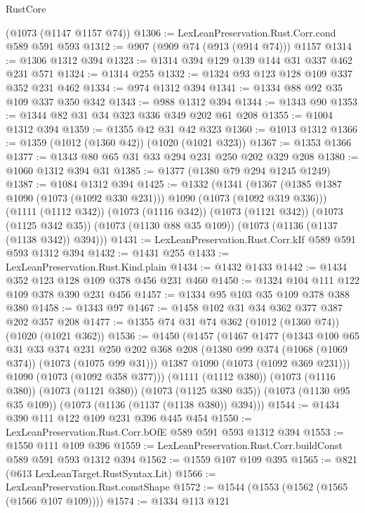 \begin{lexlean}{RustCore}
\begin{coremodule}
    (@1073 (@1147 @1157 @74))
@1306 := LexLeanPreservation.Rust.Corr.cond @589 @591 @593
@1312 := @907 (@909 @74 (@913 (@914 @74))) @1157
@1314 := @1306 @1312 @394
@1323 := @1314 @394 @129 @139 @144 @31 @337 @462 @231 @571
@1324 := @1314 @255
@1332 := @1324 @93 @123 @128 @109 @337 @352 @231 @462
@1334 := @974 @1312 @394
@1341 := @1334 @88 @92 @35 @109 @337 @350 @342
@1343 := @988 @1312 @394
@1344 := @1343 @90
@1353 := @1344 @82 @31 @34 @323 @336 @349 @202 @61 @208
@1355 := @1004 @1312 @394
@1359 := @1355 @42 @31 @42 @323
@1360 := @1013 @1312
@1366 := @1359 (@1012 (@1360 @42)) (@1020 (@1021 @323))
@1367 := @1353 @1366
@1377 := @1343 @80 @65 @31 @33 @294 @231 @250 @202 @329 @208
@1380 := @1060 @1312 @394 @31
@1385 := @1377 (@1380 @79 @294 @1245 @1249)
@1387 := @1084 @1312 @394
@1425 := @1332
    (@1341
      (@1367 (@1385 @1387 @1090 (@1073 (@1092 @330 @231))) @1090 (@1073 (@1092 @319 @336)))
      (@1111 (@1112 @342))
      (@1073 (@1116 @342))
      (@1073 (@1121 @342))
      (@1073 (@1125 @342 @35))
      (@1073 (@1130 @88 @35 @109))
      (@1073 (@1136 (@1137 (@1138 @342)) @394)))
@1431 := LexLeanPreservation.Rust.Corr.kIf @589 @591 @593 @1312 @394
@1432 := @1431 @255
@1433 := LexLeanPreservation.Rust.Kind.plain
@1434 := @1432 @1433
@1442 := @1434 @352 @123 @128 @109 @378 @456 @231 @460
@1450 := @1324 @104 @111 @122 @109 @378 @390 @231 @456
@1457 := @1334 @95 @103 @35 @109 @378 @388 @380
@1458 := @1343 @97
@1467 := @1458 @102 @31 @34 @362 @377 @387 @202 @357 @208
@1477 := @1355 @74 @31 @74 @362 (@1012 (@1360 @74)) (@1020 (@1021 @362))
@1536 := @1450
    (@1457
      (@1467
        @1477
        (@1343
          @100
          @65
          @31
          @33
          @374
          @231
          @250
          @202
          @368
          @208
          (@1380 @99 @374 (@1068 (@1069 @374)) (@1073 (@1075 @99 @31)))
          @1387
          @1090
          (@1073 (@1092 @369 @231)))
        @1090
        (@1073 (@1092 @358 @377)))
      (@1111 (@1112 @380))
      (@1073 (@1116 @380))
      (@1073 (@1121 @380))
      (@1073 (@1125 @380 @35))
      (@1073 (@1130 @95 @35 @109))
      (@1073 (@1136 (@1137 (@1138 @380)) @394)))
@1544 := @1434 @390 @111 @122 @109 @231 @396 @445 @454
@1550 := LexLeanPreservation.Rust.Corr.bOfE @589 @591 @593 @1312 @394
@1553 := @1550 @111 @109 @396
@1559 := LexLeanPreservation.Rust.Corr.buildConst @589 @591 @593 @1312 @394
@1562 := @1559 @107 @109 @395
@1565 := @821 (@613 LexLeanTarget.RustSyntax.Lit)
@1566 := LexLeanPreservation.Rust.constShape
@1572 := @1544 (@1553 (@1562 (@1565 (@1566 @107 @109))))
@1574 := @1334 @113 @121

\end{coremodule}
\end{lexlean}
